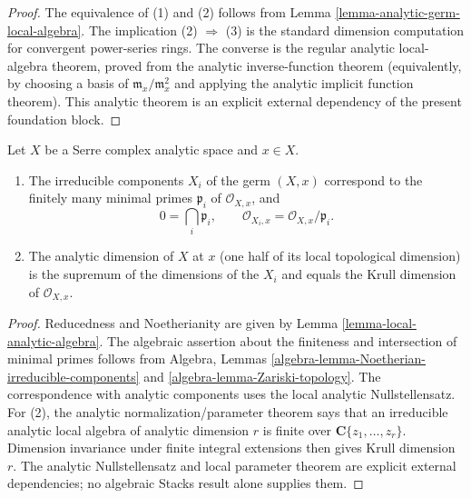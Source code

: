 \begin{proof}
The equivalence of (1) and (2) follows from Lemma
\ref{lemma-analytic-germ-local-algebra}. The implication (2) $\Rightarrow$
(3) is the standard dimension computation for convergent power-series
rings. The converse is the regular analytic local-algebra theorem, proved
from the analytic inverse-function theorem (equivalently, by choosing a
basis of $\mathfrak m_x/\mathfrak m_x^2$ and applying the analytic implicit
function theorem). This analytic theorem is an explicit external dependency
of the present foundation block.
\end{proof}

\begin{lemma}
\label{lemma-components-dimension-analytic-space}
\begin{reference}
\cite[\S 1, no. 4, pp. 6--7]{GAGA}
\end{reference}
Let $X$ be a Serre complex analytic space and $x\in X$.
\begin{enumerate}
\item The irreducible components $X_i$ of the germ $(X,x)$ correspond to
the finitely many minimal primes $\mathfrak p_i$ of $\mathcal O_{X,x}$, and
$$
0=\bigcap_i\mathfrak p_i,
\qquad
\mathcal O_{X_i,x}=\mathcal O_{X,x}/\mathfrak p_i.
$$
\item The analytic dimension of $X$ at $x$ (one half of its local topological
dimension) is the supremum of the dimensions of the $X_i$ and equals the
Krull dimension of $\mathcal O_{X,x}$.
\end{enumerate}
\end{lemma}

\begin{proof}
Reducedness and Noetherianity are given by Lemma
\ref{lemma-local-analytic-algebra}. The algebraic assertion about the
finiteness and intersection of minimal primes follows from Algebra, Lemmas
\ref{algebra-lemma-Noetherian-irreducible-components} and
\ref{algebra-lemma-Zariski-topology}. The correspondence with analytic
components uses the local analytic Nullstellensatz. For (2), the analytic
normalization/parameter theorem says that an irreducible analytic local
algebra of analytic dimension $r$ is finite over
$\mathbf C\{z_1,\ldots,z_r\}$. Dimension invariance under finite integral
extensions then gives Krull dimension $r$. The analytic Nullstellensatz and
local parameter theorem are explicit external dependencies; no algebraic
Stacks result alone supplies them.
\end{proof}




